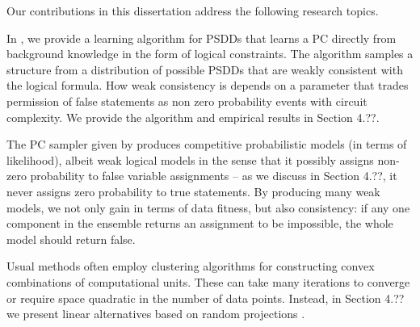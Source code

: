 Our contributions in this dissertation address the following research topics.


In \citet{geh21a}, we provide a learning algorithm for PSDDs that learns a PC directly from
background knowledge in the form of logical constraints. The algorithm samples a structure from a
distribution of possible PSDDs that are weakly consistent with the logical formula. How weak
consistency is depends on a parameter that trades permission of false statements as non zero
probability events with circuit complexity. We provide the algorithm and empirical results in
Section 4.??.


The PC sampler given by \citet{geh21a} produces competitive probabilistic models (in terms of
likelihood), albeit weak logical models in the sense that it possibly assigns non-zero probability
to false variable assignments -- as we discuss in Section 4.??, it never assigns zero probability
to true statements. By producing many weak models, we not only gain in terms of data fitness, but
also consistency: if any one component in the ensemble returns an assignment to be impossible, the
whole model should return false.


Usual methods often employ clustering algorithms for constructing convex combinations of
computational units. These can take many iterations to converge or require space quadratic in the
number of data points. Instead, in Section 4.?? we present linear alternatives based on random
projections \citep{dasgupta08a,dasgupta08b}.

